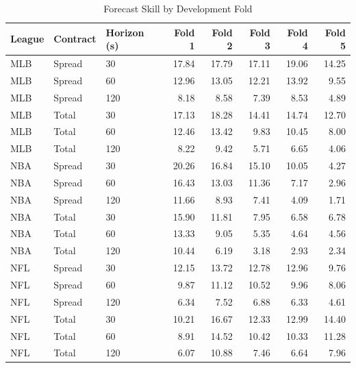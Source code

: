 \begin{table}[htbp]\centering\small
\caption{Forecast Skill by Development Fold}
\label{tab:fold-skill}
\begin{tabular}{@{}lllrrrrr@{}}\toprule
League & Contract & Horizon (s) & Fold 1 & Fold 2 & Fold 3 & Fold 4 & Fold 5\\\midrule
MLB & Spread & 30 & 17.84 & 17.79 & 17.11 & 19.06 & 14.25\\
MLB & Spread & 60 & 12.96 & 13.05 & 12.21 & 13.92 & 9.55\\
MLB & Spread & 120 & 8.18 & 8.58 & 7.39 & 8.53 & 4.89\\
MLB & Total & 30 & 17.13 & 18.28 & 14.41 & 14.74 & 12.70\\
MLB & Total & 60 & 12.46 & 13.42 & 9.83 & 10.45 & 8.00\\
MLB & Total & 120 & 8.22 & 9.42 & 5.71 & 6.65 & 4.06\\
NBA & Spread & 30 & 20.26 & 16.84 & 15.10 & 10.05 & 4.27\\
NBA & Spread & 60 & 16.43 & 13.03 & 11.36 & 7.17 & 2.96\\
NBA & Spread & 120 & 11.66 & 8.93 & 7.41 & 4.09 & 1.71\\
NBA & Total & 30 & 15.90 & 11.81 & 7.95 & 6.58 & 6.78\\
NBA & Total & 60 & 13.33 & 9.05 & 5.35 & 4.64 & 4.56\\
NBA & Total & 120 & 10.44 & 6.19 & 3.18 & 2.93 & 2.34\\
NFL & Spread & 30 & 12.15 & 13.72 & 12.78 & 12.96 & 9.76\\
NFL & Spread & 60 & 9.87 & 11.12 & 10.52 & 9.96 & 8.06\\
NFL & Spread & 120 & 6.34 & 7.52 & 6.88 & 6.33 & 4.61\\
NFL & Total & 30 & 10.21 & 16.67 & 12.33 & 12.99 & 14.40\\
NFL & Total & 60 & 8.91 & 14.52 & 10.42 & 10.33 & 11.28\\
NFL & Total & 120 & 6.07 & 10.88 & 7.46 & 6.64 & 7.96\\
\bottomrule\end{tabular}
\end{table}
